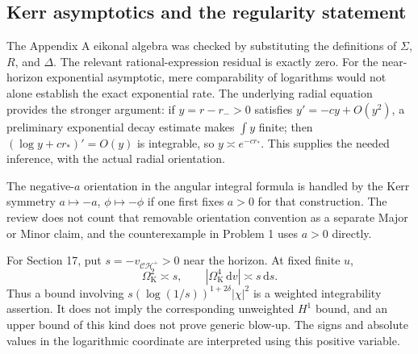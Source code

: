 \documentclass[10pt]{article}
\begin{document}
\subsection*{Kerr asymptotics and the regularity statement}
The Appendix A eikonal algebra was checked by substituting the definitions of \(\Sigma\), \(R\), and \(\Delta\). The relevant rational-expression residual is exactly zero. For the near-horizon exponential asymptotic, mere comparability of logarithms would not alone establish the exact exponential rate. The underlying radial equation provides the stronger argument: if \(y=r-r_->0\) satisfies \(y'=-cy+O(y^2)\), a preliminary exponential decay estimate makes \(\int y\) finite; then \((\log y+cr_*)'=O(y)\) is integrable, so \(y\asymp e^{-cr_*}\). This supplies the needed inference, with the actual radial orientation.\par
The negative-\(a\) orientation in the angular integral formula is handled by the Kerr symmetry \(a\mapsto-a\), \(\phi\mapsto-\phi\) if one first fixes \(a>0\) for that construction. The review does not count that removable orientation convention as a separate Major or Minor claim, and the counterexample in Problem 1 uses \(a>0\) directly.\par
For Section 17, put \(s=-v_{\mathcal{CH}^{+}}>0\) near the horizon. At fixed finite \(u\), \[\Omega_{\mathrm K}^2\asymp s,\qquad
 |\Omega_{\mathrm K}^4\,\mathrm dv|\asymp s\,\mathrm ds.\] Thus a bound involving \(s(\log(1/s))^{1+2\delta}|\chi|^2\) is a weighted integrability assertion. It does not imply the corresponding unweighted \(H^1\) bound, and an upper bound of this kind does not prove generic blow-up. The signs and absolute values in the logarithmic coordinate are interpreted using this positive variable.\par
\end{document}
